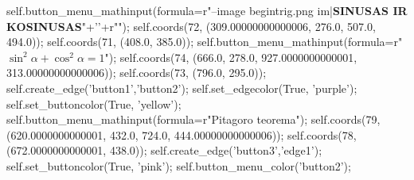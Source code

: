 self.button_menu_mathinput(formula=r"--image begintrig.png im|\textbf{SINUSAS IR KOSINUSAS}"+'\n'+r"");
self.coords(72, (309.00000000000006, 276.0, 507.0, 494.0));
self.coords(71, (408.0, 385.0));
self.button_menu_mathinput(formula=r"\Huge $\sin^2{\alpha}+\cos^2{\alpha}=1$");
self.coords(74, (666.0, 278.0, 927.0000000000001, 313.00000000000006));
self.coords(73, (796.0, 295.0));
self.create_edge('button1','button2');
self.set_edgecolor(True, 'purple');
self.set_buttoncolor(True, 'yellow');
self.button_menu_mathinput(formula=r"Pitagoro teorema");
self.coords(79, (620.0000000000001, 432.0, 724.0, 444.00000000000006));
self.coords(78, (672.0000000000001, 438.0));
self.create_edge('button3','edge1');
self.set_buttoncolor(True, 'pink');
self.button_menu_color('button2');
